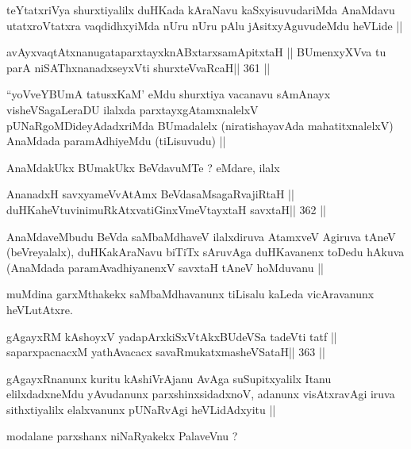 \begin{artha}
teYtatxriVya shurxtiyalilx duHKada kAraNavu kaSxyisuvudariMda AnaMdavu utatxroVtatxra vaqdidhxyiMda nUru nUru pAlu jAsitxyAguvudeMdu heVLide ||
\end{artha}

\begin{shl}
avAyxvaqtAtxnanugataparxtayxknABxtarxsamApitxtaH ||
BUmenxyXVva tu parA niSAThx\s\s nanadxseyxVti shurxteVvaRcaH\hfill || 361 ||
\end{shl}

\begin{artha}
``yoVveYBUmA tatusxKaM' eMdu shurxtiya vacanavu sAmAnayx visheVSagaLeraDU ilalxda parxtayxgAtamxnalelxV pUNaRgoMDideyAdadxriMda BUmadalelx (niratishayavAda mahatitxnalelxV) AnaMdada paramAdhiyeMdu (tiLisuvudu) ||
\end{artha}

\begin{artha}
AnaMdakUkx BUmakUkx BeVdavuMTe ? eMdare, ilalx
\end{artha}

\begin{shl}
AnanadxH savxyameVvA\s\s tAmx BeVdasaMsagaRvajiRtaH ||
duHKaheVtuvinimuRkAtxvatiGinxVmeVtayxtaH savxtaH\hfill || 362 ||
\end{shl}

\begin{artha}
AnaMdaveMbudu BeVda saMbaMdhaveV ilalxdiruva AtamxveV Agiruva tAneV (beVreyalalx), duHKakAraNavu biTiTx sAruvAga duHKavanenx toDedu hAkuva (AnaMdada paramAvadhiyanenxV savxtaH tAneV hoMduvanu ||
\end{artha}

\begin{artha}
muMdina garxMthakekx saMbaMdhavanunx tiLisalu kaLeda vicAravanunx heVLutAtxre.
\end{artha}

\begin{shl}
gAgayxRM kAshoyxV yadapArxkiSxVtAkxBUdeVSa tadeVti tatf ||
saparxpacnacxM yathAvacacx savaRmukatxmasheVSataH\hfill || 363 ||
\end{shl}

\begin{artha}
gAgayxRnanunx kuritu kAshiVrAjanu AvAga suSupitxyalilx Itanu elilxdadxneMdu yAvudanunx parxshinxsidadxnoV, adanunx visAtxravAgi iruva sithxtiyalilx elalxvanunx pUNaRvAgi heVLidAdxyitu ||
\end{artha}

\begin{artha}
modalane parxshanx niNaRyakekx PalaveVnu ?
\end{artha}


